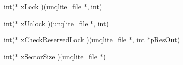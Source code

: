\begin{DoxyCompactItemize}
\item 
int($\ast$ \hyperlink{structunqlite__io__methods_a7a7becb00dc7817bf421b8623da5554e}{x\-Lock} )(\hyperlink{structunqlite__file}{unqlite\-\_\-file} $\ast$, int)
\item 
int($\ast$ \hyperlink{structunqlite__io__methods_addf61dee37aa5018d0f3bdc995dcf13e}{x\-Unlock} )(\hyperlink{structunqlite__file}{unqlite\-\_\-file} $\ast$, int)
\item 
int($\ast$ \hyperlink{structunqlite__io__methods_a1f51d4873b4990af2970b380df2b0f82}{x\-Check\-Reserved\-Lock} )(\hyperlink{structunqlite__file}{unqlite\-\_\-file} $\ast$, int $\ast$p\-Res\-Out)
\item 
int($\ast$ \hyperlink{structunqlite__io__methods_a2e2302c2aa9f8ad6e5e53538932eca73}{x\-Sector\-Size} )(\hyperlink{structunqlite__file}{unqlite\-\_\-file} $\ast$)
\end{DoxyCompactItemize}


